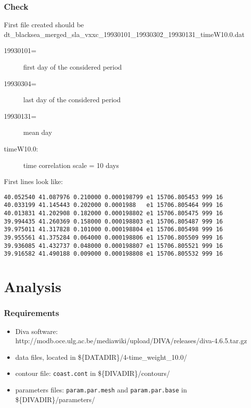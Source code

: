 \begin{frame}[fragile]
\frametitle{Check}
\footnotesize

First file created should be\\
{\scriptsize dt\_blacksea\_merged\_sla\_vxxc\_19930101\_19930302\_19930131\_timeW10.0.dat}


\begin{description}
\item[19930101=] first day of the considered period
\item[19930304=] last day of the considered period
\item[19930131=] mean day
\item[timeW10.0:] time correlation scale = 10 days
\end{description}

First lines look like:
{\scriptsize
\begin{verbatim}
40.052540 41.087976 0.210000 0.000198799 e1 15706.805453 999 16
40.033199 41.145443 0.202000 0.0001988   e1 15706.805464 999 16
40.013831 41.202908 0.182000 0.000198802 e1 15706.805475 999 16
39.994435 41.260369 0.158000 0.000198803 e1 15706.805487 999 16
39.975011 41.317828 0.101000 0.000198804 e1 15706.805498 999 16
39.955561 41.375284 0.064000 0.000198806 e1 15706.805509 999 16
39.936085 41.432737 0.048000 0.000198807 e1 15706.805521 999 16
39.916582 41.490188 0.009000 0.000198808 e1 15706.805532 999 16
\end{verbatim}
}

\end{frame}

\section{Analysis}
\begin{frame}
\frametitle{Requirements}
\footnotesize

\begin{itemize}
\item[\checkmark] Diva software: {http://modb.oce.ulg.ac.be/mediawiki/upload/DIVA/releases/diva-4.6.5.tar.gz}
\item[\checkmark] data files, located in \$\{DATADIR\}/4-time\_weight\_10.0/
\item[\checkmark] contour file: \texttt{coast.cont} in \$\{DIVADIR\}/contours/
\item[\checkmark] parameters files: \texttt{param.par.mesh} and \texttt{param.par.base} in \$\{DIVADIR\}/parameters/
\end{itemize}

\end{frame}



